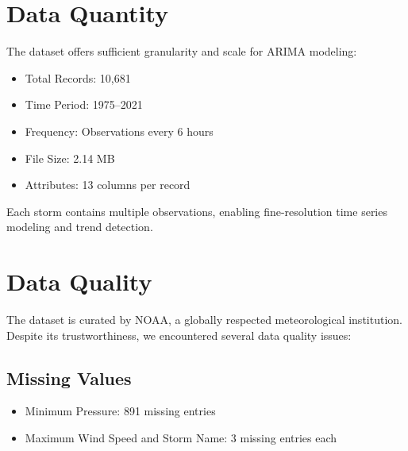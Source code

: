 \section{Data Quantity}
The dataset offers sufficient granularity and scale for ARIMA modeling:

\begin{itemize}
	\item Total Records: 10,681
	\item Time Period: 1975–2021
	\item Frequency: Observations every 6 hours
	\item File Size: 2.14 MB
	\item Attributes: 13 columns per record
\end{itemize}


Each storm contains multiple observations, enabling fine-resolution time series modeling and trend detection.

\section{Data Quality}
The dataset is curated by NOAA, a globally respected meteorological institution. Despite its trustworthiness, we encountered several data quality issues:

\subsection{Missing Values}
\begin{itemize}
	\item Minimum Pressure: 891 missing entries
	\item Maximum Wind Speed and Storm Name: 3 missing entries each
\end{itemize}

